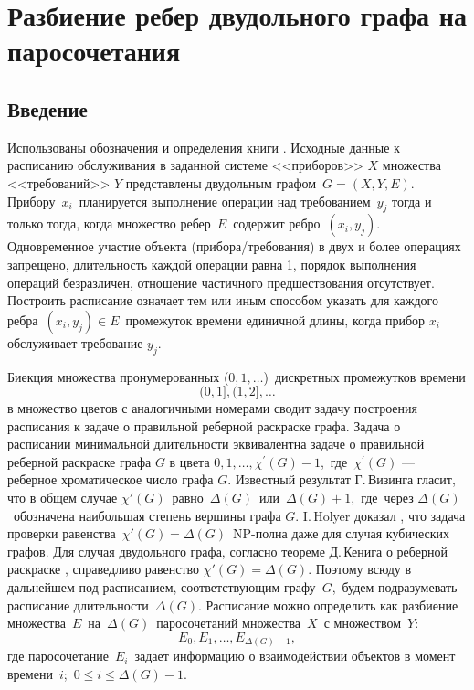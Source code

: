 \chapter{Разбиение ребер двудольного графа на паросочетания}\label{akm1}

\section{Введение}
Использованы обозначения и определения книги \cite{akm-1}.
Исходные данные к расписанию обслуживания в заданной системе <<приборов>> $X$ множества <<требований>> $Y$ представлены двудольным графом\ ${G=(X,Y,E)}$. Прибору\ $x_i$\ планируется выполнение операции над требованием\ $y_j$ тогда  и только тогда, когда множество ребер\ $E$\ содержит ребро\ $(x_i,y_j)$. Одновременное участие объекта (прибора/требования) в двух и более операциях запрещено, длительность каждой операции равна 1, порядок выполнения операций безразличен, отношение частичного предшествования отсутствует. Построить расписание означает тем или иным способом указать для каждого ребра\ $(x_i,y_j )\in E$\ промежуток времени единичной длины, когда прибор $x_i$ обслуживает требование $y_j$.
\par\medskip
Биекция множества пронумерованных ($0, 1,\dots $)\  дискретных промежутков времени
$$
(0,1], (1,2], \dots
$$
в множество цветов с аналогичными номерами сводит задачу построения расписания к задаче о правильной реберной раскраске графа. Задача о расписании минимальной длительности эквивалентна задаче о правильной реберной раскраске графа $G$ в цвета $0, 1,\dots, \chi^\prime(G)-1 $,\ где\ $\chi^\prime(G)$ --- реберное хроматическое число графа $G$. Известный результат Г.\,Визинга \cite{akm-2} гласит, что в общем случае $\chi'(G)$\ равно\ $\Delta(G)$\ или\ $\Delta(G)+1$,\ где\ через $\Delta(G)$\ обозначена наибольшая степень вершины графа $G$. I.\,Holyer доказал \cite{akm-3}, что задача проверки равенства\ $\chi'(G)= \Delta(G)$\  NP-полна даже для случая кубических графов. Для случая двудольного графа, согласно теореме Д.\,Кенига о реберной раскраске \cite[c.\,80]{akm-4}, справедливо равенство $\chi'(G)=\Delta(G)$. Поэтому всюду в дальнейшем под расписанием, соответствующим графу\ $G$,\ будем подразумевать расписание длительности\ $\Delta(G)$. Расписание можно определить как разбиение множества\ $E$\ на\ $\Delta(G)$\ паросочетаний множества\ $X$\ с множеством\ $Y$:
\begin{equation}\label {eq01}
E_0,E_1,\dots, E_{\Delta(G)-1},
\end{equation}
где паросочетание\ $E_i$\  задает информацию о взаимодействии объектов в момент времени\ $i$;\ $0\leqslant i\leqslant \Delta(G)-1$.

